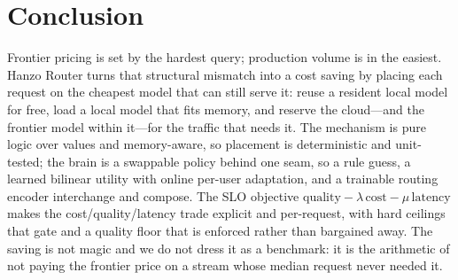 \documentclass[11pt]{article}
\begin{document}
\section{Conclusion}

Frontier pricing is set by the hardest query; production volume is in the
easiest. Hanzo Router turns that structural mismatch into a cost saving by
placing each request on the cheapest model that can still serve it: reuse a
resident local model for free, load a local model that fits memory, and reserve
the cloud---and the frontier model within it---for the traffic that needs it.
The mechanism is pure logic over values and memory-aware, so placement is
deterministic and unit-tested; the brain is a swappable policy behind one seam,
so a rule guess, a learned bilinear utility with online per-user adaptation, and
a trainable routing encoder interchange and compose. The SLO objective
$\mathrm{quality}-\lambda\,\mathrm{cost}-\mu\,\mathrm{latency}$ makes the
cost/quality/latency trade explicit and per-request, with hard ceilings that
gate and a quality floor that is enforced rather than bargained away. The saving
is not magic and we do not dress it as a benchmark: it is the arithmetic of not
paying the frontier price on a stream whose median request never needed it.

{\small


}
\end{document}
